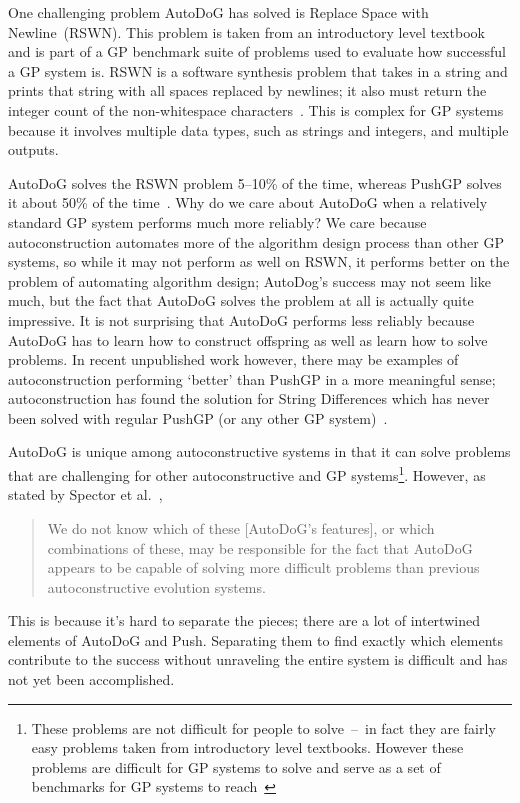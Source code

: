 \documentclass{sig-alternate}
\begin{document}
One challenging problem AutoDoG has solved is Replace Space with Newline~(RSWN). This problem is taken from an introductory level textbook and is part of a GP benchmark suite of problems used to evaluate how successful a GP system is. RSWN is a software synthesis problem that takes in a string and prints that string with all spaces replaced by newlines; it also must return the integer count of the non-whitespace characters~\cite{helmuth:2015}. This is complex for GP systems because it involves multiple data types, such as strings and integers, and multiple outputs.

AutoDoG solves the RSWN problem 5--10\% of the time, whereas PushGP solves it about 50\% of the time~\cite{helmuth:2015}. Why do we care about AutoDoG when a relatively standard GP system performs much more reliably? We care because autoconstruction automates more of the algorithm design process than other GP systems, so while it may not perform as well on RSWN, it performs better on the problem of automating algorithm design; AutoDog's success may not seem like much, but the fact that AutoDoG solves the problem at all is actually quite impressive. It is not surprising that AutoDoG performs less reliably because AutoDoG has to learn how to construct offspring as well as learn how to solve problems. In recent unpublished work however, there may be examples of autoconstruction performing `better' than PushGP in a more meaningful sense; autoconstruction has found the solution for String Differences which has never been solved with regular PushGP (or any other GP system)~\cite{eva:2017}.

AutoDoG is unique among autoconstructive systems in that it can solve problems that are challenging for other autoconstructive and GP systems\footnote{These problems are not difficult for people to solve~--~in fact they are fairly easy problems taken from introductory level textbooks. However these problems are difficult for GP systems to solve and serve as a set of benchmarks for GP systems to reach~\cite{helmuth:2015}}. However, as stated by Spector et al.~\cite{spector:2016},
\begin{quotation}
	We do not know which of these [AutoDoG's features], or which combinations of these, may be responsible for the fact that AutoDoG appears to be capable of solving more difficult problems than previous autoconstructive evolution systems.
\end{quotation}
This is because it's hard to separate the pieces; there are a lot of intertwined elements of AutoDoG and Push. Separating them to find exactly which elements contribute to the success without unraveling the entire system is difficult and has not yet been accomplished.
\end{document}
